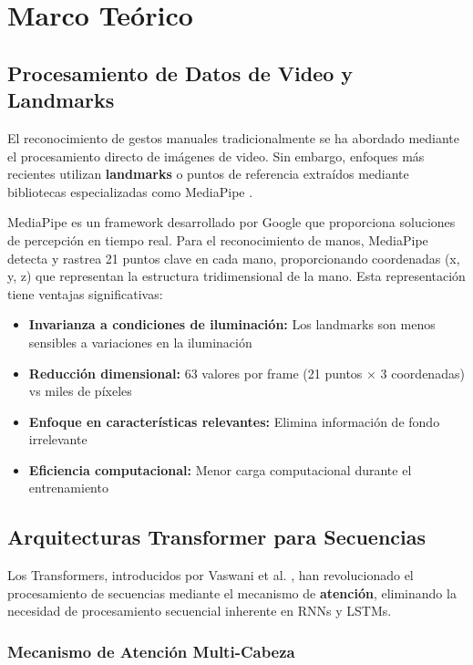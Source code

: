 \documentclass[12pt,a4paper]{article}
\begin{document}
\section{Marco Teórico}

\subsection{Procesamiento de Datos de Video y Landmarks}

El reconocimiento de gestos manuales tradicionalmente se ha abordado mediante el procesamiento directo de imágenes de video. Sin embargo, enfoques más recientes utilizan \textbf{landmarks} o puntos de referencia extraídos mediante bibliotecas especializadas como MediaPipe \cite{mediapipe2019}. 

MediaPipe es un framework desarrollado por Google que proporciona soluciones de percepción en tiempo real. Para el reconocimiento de manos, MediaPipe detecta y rastrea 21 puntos clave en cada mano, proporcionando coordenadas (x, y, z) que representan la estructura tridimensional de la mano. Esta representación tiene ventajas significativas:

\begin{itemize}
    \item \textbf{Invarianza a condiciones de iluminación:} Los landmarks son menos sensibles a variaciones en la iluminación
    \item \textbf{Reducción dimensional:} 63 valores por frame (21 puntos × 3 coordenadas) vs miles de píxeles
    \item \textbf{Enfoque en características relevantes:} Elimina información de fondo irrelevante
    \item \textbf{Eficiencia computacional:} Menor carga computacional durante el entrenamiento
\end{itemize}

\subsection{Arquitecturas Transformer para Secuencias}

Los Transformers, introducidos por Vaswani et al. \cite{vaswani2017attention}, han revolucionado el procesamiento de secuencias mediante el mecanismo de \textbf{atención}, eliminando la necesidad de procesamiento secuencial inherente en RNNs y LSTMs.

\subsubsection{Mecanismo de Atención Multi-Cabeza}
\end{document}

